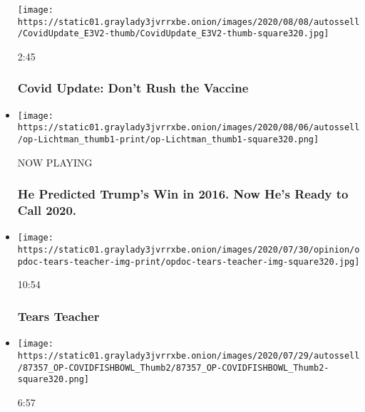 \begin{itemize}
  \texttt{[image: https://static01.graylady3jvrrxbe.onion/images/2020/08/08/autossell/CovidUpdate\_E3V2-thumb/CovidUpdate\_E3V2-thumb-square320.jpg]}

  2:45

  \hypertarget{covid-update-dont-rush-the-vaccine}{%
  \subsubsection{Covid Update: Don't Rush the
  Vaccine}\label{covid-update-dont-rush-the-vaccine}}
\item
  \texttt{[image: https://static01.graylady3jvrrxbe.onion/images/2020/08/06/autossell/op-Lichtman\_thumb1-print/op-Lichtman\_thumb1-square320.png]}

  NOW PLAYING

  \hypertarget{he-predicted-trumps-win-in-2016-now-hes-ready-to-call-2020-2}{%
  \subsubsection{He Predicted Trump's Win in 2016. Now He's Ready to
  Call
  2020.}\label{he-predicted-trumps-win-in-2016-now-hes-ready-to-call-2020-2}}
\item
  \href{https://www.nytimes3xbfgragh.onion/video/opinion/100000007247238/tears-teacher.html?action=click\&module=video-series-bar\&region=header\&pgtype=Article\&playlistId=video/opinion}{}

  \texttt{[image: https://static01.graylady3jvrrxbe.onion/images/2020/07/30/opinion/opdoc-tears-teacher-img-print/opdoc-tears-teacher-img-square320.jpg]}

  10:54

  \hypertarget{tears-teacher}{%
  \subsubsection{Tears Teacher}\label{tears-teacher}}
\item
  \href{https://www.nytimes3xbfgragh.onion/video/opinion/100000007227777/covid-19-global-response.html?action=click\&module=video-series-bar\&region=header\&pgtype=Article\&playlistId=video/opinion}{}

  \texttt{[image: https://static01.graylady3jvrrxbe.onion/images/2020/07/29/autossell/87357\_OP-COVIDFISHBOWL\_Thumb2/87357\_OP-COVIDFISHBOWL\_Thumb2-square320.png]}

  6:57

  \hypertarget{thats-ridiculous-how-americas-coronavirus-response-looks-abroad}{%
}
\end{itemize}
